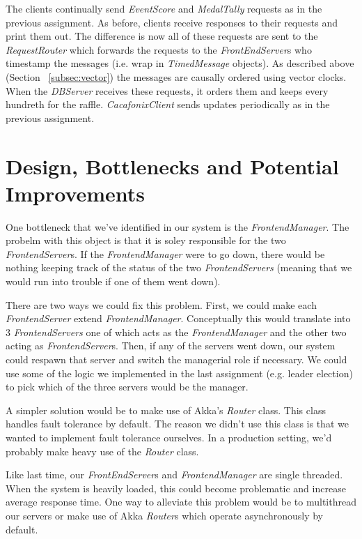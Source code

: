 \documentclass[11pt]{article}
\begin{document}
The clients continually send \emph{EventScore} and \emph{MedalTally}
requests as in the previous assignment. As before, clients receive
responses to their requests and print them out. The difference is now
all of these requests are sent to the \emph{RequestRouter} which
forwards the requests to the \emph{FrontEndServer}s who timestamp the
messages (i.e. wrap in \emph{TimedMessage} objects).  As described
above (Section ~\ref{subsec:vector}) the messages are causally ordered
using vector clocks.  When the \emph{DBServer} receives these
requests, it orders them and keeps every hundreth for the raffle.
\emph{CacafonixClient} sends updates periodically as in the previous
assignment.

\section{Design, Bottlenecks and Potential Improvements}
One bottleneck that we've identified in our system is the
\emph{FrontendManager}.  The probelm with this object is that it is
soley responsible for the two \emph{FrontendServer}s.  If the
\emph{FrontendManager} were to go down, there would be nothing keeping
track of the status of the two \emph{FrontendServers} (meaning that we
would run into trouble if one of them went down).

There are two ways we could fix this problem. First, we could make
each \emph{FrontendServer} extend \emph{FrontendManager}.
Conceptually this would translate into 3 \emph{FrontendServers} one of
which acts as the \emph{FrontendManager} and the other two acting as
\emph{FrontendServer}s.  Then, if any of the servers went down, our
system could respawn that server and switch the managerial role if
necessary.  We could use some of the logic we implemented in the last
assignment (e.g. leader election) to pick which of the three servers
would be the manager.

A simpler solution would be to make use of Akka's \emph{Router}
class.  This class handles fault tolerance by default.  The reason we
didn't use this class is that we wanted to implement fault tolerance
ourselves.  In a production setting, we'd probably make heavy use of
the \emph{Router} class.

Like last time, our \emph{FrontEndServer}s and \emph{FrontendManager}
are single threaded.  When the system is heavily loaded, this could
become problematic and increase average response time.  One way to
alleviate this problem would be to multithread our servers or make use
of Akka \emph{Router}s which operate asynchronously by default.
\end{document}
